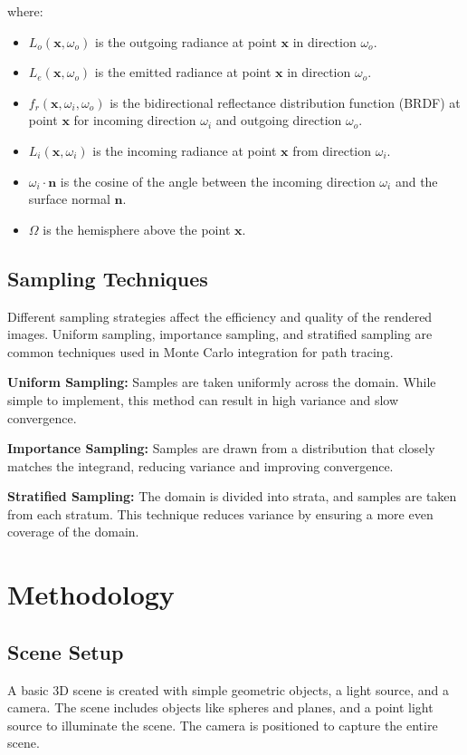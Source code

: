 \documentclass[12pt]{article}
\begin{document}
where:
\begin{itemize}
    \item $L_o(\mathbf{x}, \omega_o)$ is the outgoing radiance at point $\mathbf{x}$ in direction $\omega_o$.
    \item $L_e(\mathbf{x}, \omega_o)$ is the emitted radiance at point $\mathbf{x}$ in direction $\omega_o$.
    \item $f_r(\mathbf{x}, \omega_i, \omega_o)$ is the bidirectional reflectance distribution function (BRDF) at point $\mathbf{x}$ for incoming direction $\omega_i$ and outgoing direction $\omega_o$.
    \item $L_i(\mathbf{x}, \omega_i)$ is the incoming radiance at point $\mathbf{x}$ from direction $\omega_i$.
    \item $\omega_i \cdot \mathbf{n}$ is the cosine of the angle between the incoming direction $\omega_i$ and the surface normal $\mathbf{n}$.
    \item $\Omega$ is the hemisphere above the point $\mathbf{x}$.
\end{itemize}

\subsection{Sampling Techniques}
Different sampling strategies affect the efficiency and quality of the rendered images. Uniform sampling, importance sampling, and stratified sampling are common techniques used in Monte Carlo integration for path tracing.

\textbf{Uniform Sampling:} Samples are taken uniformly across the domain. While simple to implement, this method can result in high variance and slow convergence.

\textbf{Importance Sampling:} Samples are drawn from a distribution that closely matches the integrand, reducing variance and improving convergence.

\textbf{Stratified Sampling:} The domain is divided into strata, and samples are taken from each stratum. This technique reduces variance by ensuring a more even coverage of the domain.

\section{Methodology}
\label{sec:methodology}
\subsection{Scene Setup}
A basic 3D scene is created with simple geometric objects, a light source, and a camera. The scene includes objects like spheres and planes, and a point light source to illuminate the scene. The camera is positioned to capture the entire scene.
\end{document}
